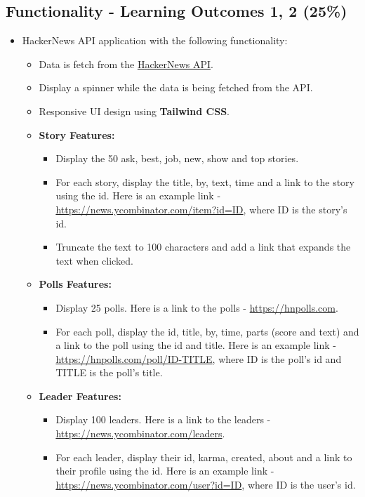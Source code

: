 \documentclass{article}
\begin{document}
	\subsection*{Functionality - Learning Outcomes 1, 2 (25\%)}
	\begin{itemize}
		 \item HackerNews API application with the following functionality:
		 \begin{itemize}
			\item Data is fetch from the \href{https://github.com/HackerNews/API}{HackerNews API}.
			\item Display a spinner while the data is being fetched from the API.
			
			\item Responsive UI design using \textbf{Tailwind CSS}.

			\item \textbf{Story Features:}
			\begin{itemize}
				\item Display the 50 ask, best, job, new, show and top stories.
				\item For each story, display the title, by, text, time and a link to the story using the id. Here is an example link - \href{https://news.ycombinator.com/item?id=ID}{https://news.ycombinator.com/item?id=ID}, where ID is the story's id.
				\item Truncate the text to 100 characters and add a link that expands the text when clicked.
			\end{itemize}

			\item \textbf{Polls Features:}
			\begin{itemize}
				\item Display 25 polls. Here is a link to the polls - \href{https://hnpolls.com}{https://hnpolls.com}. 
				\item For each poll, display the id, title, by, time, parts (score and text) and a link to the poll using the id and title. Here is an example link - \href{https://hnpolls.com/poll/ID-TITLE}{https://hnpolls.com/poll/ID-TITLE}, where ID is the poll's id and TITLE is the poll's title.
			\end{itemize}
	
			\item \textbf{Leader Features:}
			\begin{itemize}
				\item Display 100 leaders. Here is a link to the leaders - \href{https://news.ycombinator.com/leaders}{https://news.ycombinator.com/leaders}. 
				\item For each leader, display their id, karma, created, about and a link to their profile using the id. Here is an example link - \href{https://news.ycombinator.com/user?id=ID}{https://news.ycombinator.com/user?id=ID}, where ID is the user's id. 
			\end{itemize}


\end{itemize}
\end{itemize}
\end{document}

